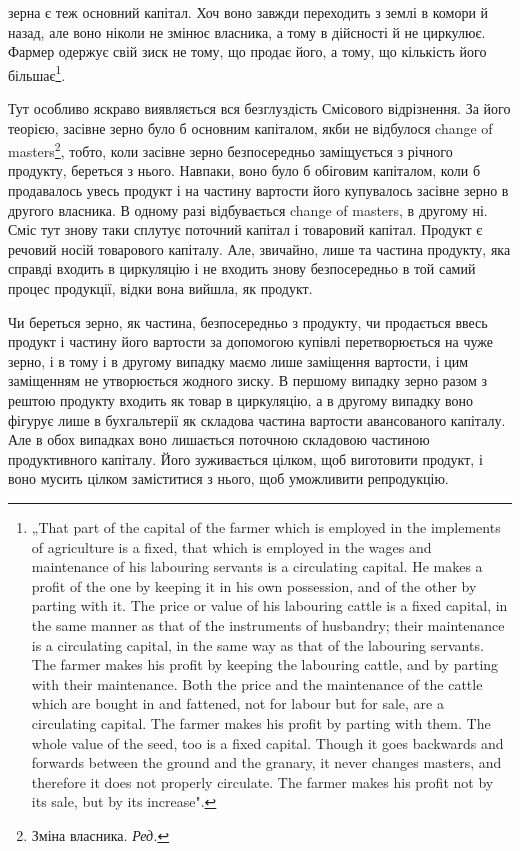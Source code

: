 зерна є теж основний капітал. Хоч воно завжди переходить з землі
в комори й назад, але воно ніколи не змінює власника, а тому в
дійсності й не циркулює. Фармер одержує свій зиск не тому, що продає
його, а тому, що кількість його більшає\footnote*{
„That part of the capital of the farmer which is employed in the implements
of agriculture is a fixed, that which is employed in the wages and maintenance of
his labouring servants is a circulating capital. He makes a profit of the one by
keeping it in his own possession, and of the other by parting with it. The price or
value of his labouring cattle is a fixed capital, in the same manner as that of the
instruments of husbandry; their maintenance is a circulating capital, in the same way
as that of the labouring servants. The farmer makes his profit by keeping the labouring
cattle, and by parting with their maintenance. Both the price and the maintenance
of the cattle which are bought in and fattened, not for labour but for sale,
are a circulating capital. The farmer makes his profit by parting with them. The whole
value of the seed, too is a fixed capital. Though it goes backwards and
forwards between the ground and the granary, it never changes masters, and therefore
it does not properly circulate. The farmer makes his profit not by its sale, but
by its increase".
}.

Тут особливо яскраво виявляється вся безглуздість Смісового відрізнення.
За його теорією, засівне зерно було б основним капіталом, якби не
відбулося change of masters\footnote*{
Зміна власника. \emph{Ред.}
}, тобто, коли засівне зерно безпосередньо
заміщується з річного продукту, береться з нього. Навпаки,
воно було б обіговим капіталом, коли б продавалось увесь продукт і на
частину вартости його купувалось засівне зерно в другого власника. В
одному разі відбувається change of masters, в другому ні. Сміс тут знову
таки сплутує поточний капітал і товаровий капітал. Продукт є речовий
носій товарового капіталу. Але, звичайно, лише та частина продукту,
яка справді входить в циркуляцію і не входить знову безпосередньо в
той самий процес продукції, відки вона вийшла, як продукт.

Чи береться зерно, як частина, безпосередньо з продукту, чи продається
ввесь продукт і частину його вартости за допомогою купівлі перетворюється
на чуже зерно, і в тому і в другому випадку маємо лише заміщення
вартости, і цим заміщенням не утворюється жодного зиску. В
першому випадку зерно разом з рештою продукту входить як товар в
циркуляцію, а в другому випадку воно фігурує лише в бухгальтерії як
складова частина вартости авансованого капіталу. Але в обох випадках
воно лишається поточною складовою частиною продуктивного капіталу.
Його зуживається цілком, щоб виготовити продукт, і воно мусить цілком
заміститися з нього, щоб уможливити репродукцію.

